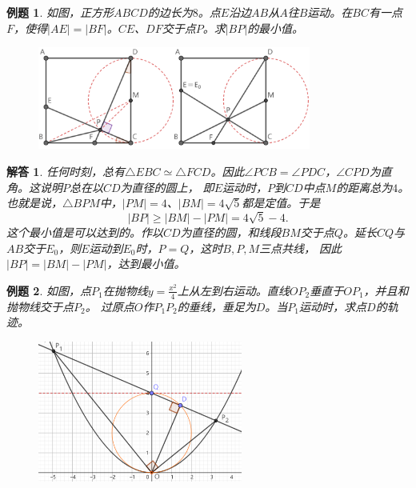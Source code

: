 \documentclass[12pt,UTF8]{ctexbook}
\newtheorem{et}{例题}[section]
\newtheorem*{so}{解答}
\begin{document}
\begin{et}
    如图，正方形$ABCD$的边长为$8$。点$E$沿边$AB$从$A$往$B$运动。在$BC$有一点$F$，使得$|AE| = |BF|$。$CE$、$DF$交于点$P$。求$|BP|$的最小值。
\end{et}

\begin{figure}[H] %
    \vspace{4pt}
    \centering
    \includegraphics[width=0.8\textwidth]{不变量1.png}
\end{figure}

\begin{so}
    任何时刻，总有$\triangle EBC \simeq \triangle FCD$。因此$\angle PCB = \angle PDC$，$\angle CPD$为直角。这说明$P$总在以$CD$为直径的圆上，
    即$E$运动时，$P$到$CD$中点$M$的距离总为$4$。也就是说，$\triangle BPM$中，$|PM| = 4$、$|BM| = 4\sqrt{5}$都是定值。于是
    $$ |BP| \geqslant |BM| - |PM| = 4\sqrt{5} - 4.$$
    这个最小值是可以达到的。作以$CD$为直径的圆，和线段$BM$交于点$Q$。延长$CQ$与$AB$交于$E_0$，则$E$运动到$E_0$时，$P=Q$，这时$B,P,M$三点共线，
    因此$|BP| = |BM| - |PM|$，达到最小值。
\end{so}

\begin{et}
    如图，点$P_1$在抛物线$y = \frac{x^2}{4}$上从左到右运动。直线$OP_2$垂直于$OP_1$，并且和抛物线交于点$P_2$。
    过原点$O$作$P_1P_2$的垂线，垂足为$D$。当$P_1$运动时，求点$D$的轨迹。
\end{et}

\begin{figure}[H] %
    \vspace{4pt}
    \centering
    \includegraphics[width=0.6\textwidth]{不变量2.png}
\end{figure}
\end{document}
